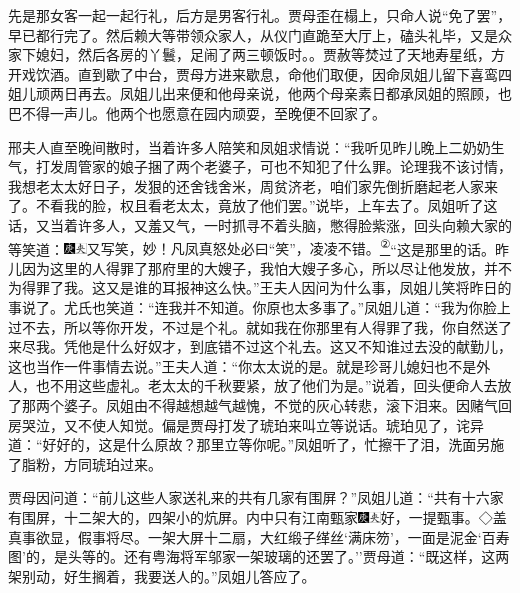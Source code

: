 先是那女客一起一起行礼，后方是男客行礼。贾母歪在榻上，只命人说``免了罢''，早已都行完了。然后赖大等带领众家人，从仪门直跪至大厅上，磕头礼毕，又是众家下媳妇，然后各房的丫鬟，足闹了两三顿饭时。。贾赦等焚过了天地寿星纸，方开戏饮酒。直到歇了中台，贾母方进来歇息，命他们取便，因命凤姐儿留下喜鸾四姐儿顽两日再去。凤姐儿出来便和他母亲说，他两个母亲素日都承凤姐的照顾，也巴不得一声儿。他两个也愿意在园内顽耍，至晚便不回家了。

邢夫人直至晚间散时，当着许多人陪笑和凤姐求情说：``我听见昨儿晚上二奶奶生气，打发周管家的娘子捆了两个老婆子，可也不知犯了什么罪。论理我不该讨情，我想老太太好日子，发狠的还舍钱舍米，周贫济老，咱们家先倒折磨起老人家来了。不看我的脸，权且看老太太，竟放了他们罢。''说毕，上车去了。凤姐听了这话，又当着许多人，又羞又气，一时抓寻不着头脑，憋得脸紫涨，回头向赖大家的等笑道：{\includegraphics[width=3mm]{../Images/00004}\includegraphics[width=3mm]{../Images/00012}\footnotesize \kaishu 又写笑，妙！凡凤真怒处必曰``笑''，凌凌不错。}\href{../Text/part0075_split_000.html\#lnkback_2_a}{\textsuperscript{②}}``这是那里的话。昨儿因为这里的人得罪了那府里的大嫂子，我怕大嫂子多心，所以尽让他发放，并不为得罪了我。这又是谁的耳报神这么快。''王夫人因问为什么事，凤姐儿笑将昨日的事说了。尤氏也笑道：``连我并不知道。你原也太多事了。''凤姐儿道：``我为你脸上过不去，所以等你开发，不过是个礼。就如我在你那里有人得罪了我，你自然送了来尽我。凭他是什么好奴才，到底错不过这个礼去。这又不知谁过去没的献勤儿，这也当作一件事情去说。''王夫人道：``你太太说的是。就是珍哥儿媳妇也不是外人，也不用这些虚礼。老太太的千秋要紧，放了他们为是。''说着，回头便命人去放了那两个婆子。凤姐由不得越想越气越愧，不觉的灰心转悲，滚下泪来。因赌气回房哭泣，又不使人知觉。偏是贾母打发了琥珀来叫立等说话。琥珀见了，诧异道：``好好的，这是什么原故？那里立等你呢。''凤姐听了，忙擦干了泪，洗面另施了脂粉，方同琥珀过来。

贾母因问道：``前儿这些人家送礼来的共有几家有围屏？''凤姐儿道：``共有十六家有围屏，十二架大的，四架小的炕屏。内中只有江南甄家{\includegraphics[width=3mm]{../Images/00004}\includegraphics[width=3mm]{../Images/00012}\footnotesize \kaishu 好，一提甄事。◇盖真事欲显，假事将尽。}一架大屏十二扇，大红缎子缂丝`满床笏'，一面是泥金`百寿图'的，是头等的。还有粤海将军邬家一架玻璃的还罢了。''贾母道：``既这样，这两架别动，好生搁着，我要送人的。''凤姐儿答应了。


